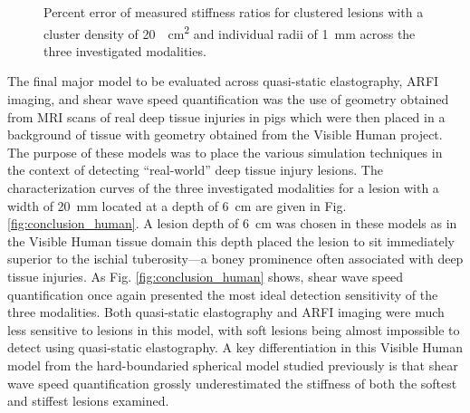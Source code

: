			\begin{figure}[!htb]
				\centering
				\caption[Percent error of measured stiffness ratios for clustered lesions across the three investigated modalities]{Percent error of measured stiffness ratios for clustered lesions with a cluster density of \SI{20}{\per\cm\squared} and individual radii of \SI{1}{\mm} across the three investigated modalities.}
				\label{fig:conclusions_cluster_pd}
			\end{figure}

			The final major model to be evaluated across quasi-static elastography, ARFI imaging, and shear wave speed quantification was the use of geometry obtained from MRI scans of real deep tissue injuries in pigs which were then placed in a background of tissue with geometry obtained from the Visible Human project. The purpose of these models was to place the various simulation techniques in the context of detecting ``real-world'' deep tissue injury lesions. The characterization curves of the three investigated modalities for a lesion with a width of \SI{20}{\mm} located at a depth of \SI{6}{\cm} are given in Fig. \ref{fig:conclusion_human}. A lesion depth of \SI{6}{\cm} was chosen in these models as in the Visible Human tissue domain this depth placed the lesion to sit immediately superior to the ischial tuberosity---a boney prominence often associated with deep tissue injuries. As Fig. \ref{fig:conclusion_human} shows, shear wave speed quantification once again presented the most ideal detection sensitivity of the three modalities. Both quasi-static elastography and ARFI imaging were much less sensitive to lesions in this model, with soft lesions being almost impossible to detect using quasi-static elastography. A key differentiation in this Visible Human model from the hard-boundaried spherical model studied previously is that shear wave speed quantification grossly underestimated the stiffness of both the softest and stiffest lesions examined.

